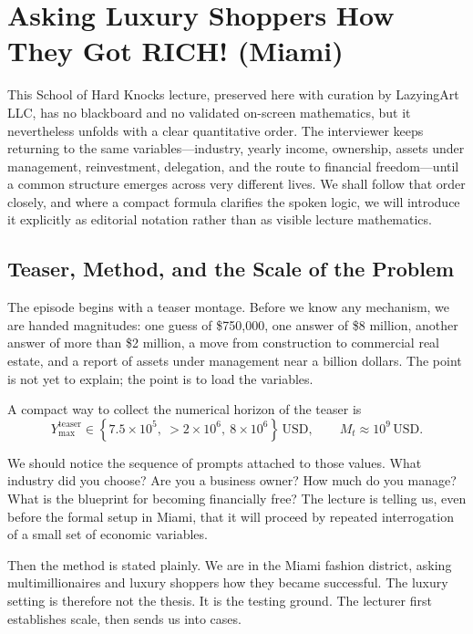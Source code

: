 \chapter{Asking Luxury Shoppers How They Got RICH! (Miami)}

This School of Hard Knocks lecture, preserved here with curation by LazyingArt LLC, has no blackboard and no validated on-screen mathematics, but it nevertheless unfolds with a clear quantitative order. The interviewer keeps returning to the same variables---industry, yearly income, ownership, assets under management, reinvestment, delegation, and the route to financial freedom---until a common structure emerges across very different lives. We shall follow that order closely, and where a compact formula clarifies the spoken logic, we will introduce it explicitly as editorial notation rather than as visible lecture mathematics.

\section{Teaser, Method, and the Scale of the Problem}

The episode begins with a teaser montage. Before we know any mechanism, we are handed magnitudes: one guess of \$750{,}000, one answer of \$8 million, another answer of more than \$2 million, a move from construction to commercial real estate, and a report of assets under management near a billion dollars. The point is not yet to explain; the point is to load the variables.

A compact way to collect the numerical horizon of the teaser is
\begin{equation}
Y_{\max}^{\text{teaser}} \in \left\{7.5\times 10^5,\ >2\times 10^6,\ 8\times 10^6\right\}\,\mathrm{USD},
\qquad
M_t \approx 10^9\,\mathrm{USD}.
\end{equation}

We should notice the sequence of prompts attached to those values. What industry did you choose? Are you a business owner? How much do you manage? What is the blueprint for becoming financially free? The lecture is telling us, even before the formal setup in Miami, that it will proceed by repeated interrogation of a small set of economic variables.

Then the method is stated plainly. We are in the Miami fashion district, asking multimillionaires and luxury shoppers how they became successful. The luxury setting is therefore not the thesis. It is the testing ground. The lecturer first establishes scale, then sends us into cases.

